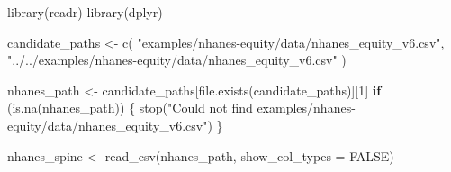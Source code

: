\documentclass[
  letterpaper,
  DIV=11,
  numbers=noendperiod,
  oneside]{scrreprt}
\newenvironment{Shaded}{\begin{snugshade}}{\end{snugshade}}
\newcommand{\AttributeTok}[1]{\textcolor[rgb]{0.40,0.45,0.13}{#1}}
\newcommand{\ConstantTok}[1]{\textcolor[rgb]{0.56,0.35,0.01}{#1}}
\newcommand{\ControlFlowTok}[1]{\textcolor[rgb]{0.00,0.23,0.31}{\textbf{#1}}}
\newcommand{\DecValTok}[1]{\textcolor[rgb]{0.68,0.00,0.00}{#1}}
\newcommand{\FunctionTok}[1]{\textcolor[rgb]{0.28,0.35,0.67}{#1}}
\newcommand{\NormalTok}[1]{\textcolor[rgb]{0.00,0.23,0.31}{#1}}
\newcommand{\OtherTok}[1]{\textcolor[rgb]{0.00,0.23,0.31}{#1}}
\newcommand{\StringTok}[1]{\textcolor[rgb]{0.13,0.47,0.30}{#1}}
\begin{document}
\begin{Shaded}
\begin{Highlighting}[numbers=left,,]
\FunctionTok{library}\NormalTok{(readr)}
\FunctionTok{library}\NormalTok{(dplyr)}

\NormalTok{candidate\_paths }\OtherTok{\textless{}{-}} \FunctionTok{c}\NormalTok{(}
  \StringTok{"examples/nhanes{-}equity/data/nhanes\_equity\_v6.csv"}\NormalTok{,}
  \StringTok{"../../examples/nhanes{-}equity/data/nhanes\_equity\_v6.csv"}
\NormalTok{)}

\NormalTok{nhanes\_path }\OtherTok{\textless{}{-}}\NormalTok{ candidate\_paths[}\FunctionTok{file.exists}\NormalTok{(candidate\_paths)][}\DecValTok{1}\NormalTok{]}
\ControlFlowTok{if}\NormalTok{ (}\FunctionTok{is.na}\NormalTok{(nhanes\_path)) \{}
  \FunctionTok{stop}\NormalTok{(}\StringTok{"Could not find examples/nhanes{-}equity/data/nhanes\_equity\_v6.csv"}\NormalTok{)}
\NormalTok{\}}

\NormalTok{nhanes\_spine }\OtherTok{\textless{}{-}} \FunctionTok{read\_csv}\NormalTok{(nhanes\_path, }\AttributeTok{show\_col\_types =} \ConstantTok{FALSE}\NormalTok{)}


\end{Highlighting}
\end{Shaded}
\end{document}
